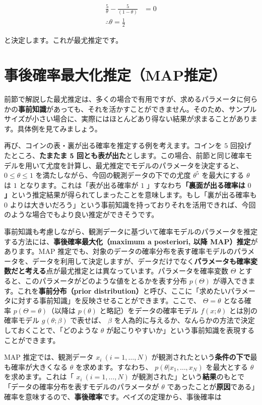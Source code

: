 \begin{align}
\frac{5}{\theta} - \frac{5}{\left( 1 - \theta \right)} &= 0 \\
\therefore \theta = \frac{1}{2}
\end{align}


と決定します。これが最尤推定です。


\section{事後確率最大化推定（MAP推定）}


前節で解説した最尤推定は、多くの場合で有用ですが、求めるパラメータに何らかの\textbf{事前知識}があっても、それを活かすことができません。そのため、サンプルサイズが小さい場合に、実際にはほとんどあり得ない結果が求まることがあります。具体例を見てみましょう。


再び、コインの表・裏が出る確率を推定する例を考えます。コインを $5$ 回投げたところ、\textbf{たまたま} ${\bf 5}$ \textbf{回とも表が出た}とします。この場合、前節と同じ確率モデルを用いて尤度を計算し、最尤推定でモデルのパラメータを決定すると、 $0 \leq \theta \leq 1$ を満たしながら、今回の観測データの下での尤度 $\theta^5$ を最大にする $\theta$ は $1$ となります。これは「表が出る確率が $1$ 」すなわち\textbf{「裏面が出る確率は} $0$\textbf{」}という推定結果が得られてしまったことを意味します。もし「裏が出る確率も $0$ よりは大きいだろう」という事前知識を持っておりそれを活用できれば、今回のような場合でもより良い推定ができそうです。


事前知識も考慮しながら、観測データに基づいて確率モデルのパラメータを推定する方法には、\textbf{事後確率最大化（maximum a posteriori, 以降 MAP）推定}があります。MAP 推定でも、対象のデータの確率分布を表す確率モデルのパラメータを、データを利用して決定しますが、データだけでなく\textbf{パラメータも確率変数だと考える}点が最尤推定とは異なっています。パラメータを確率変数 $\Theta$ とすると、このパラメータがどのような値をとるかを表す分布 $p(\Theta)$ が導入できます。これを\textbf{事前分布（prior distribution）}と呼び、ここに「求めたいパラメータに対する事前知識」を反映させることができます。ここで、 $\Theta = \theta$ となる確率 $p(\Theta = \theta)$（以降は $p(\theta)$ と略記）をデータの確率モデル $f(x; \theta)$ とは別の確率モデル $g(\theta; \beta)$ で表せば、 $\beta$ を人為的に与えるか、なんらかの方法で決定しておくことで、「どのような $\theta$ が起こりやすいか」という事前知識を表現することができます。


MAP 推定では、観測データ $x_i \ (i=1,\dots,N)$ が観測されたという\textbf{条件の下で}最も確率が大きくなる $\theta$ を求めます。すなわち、 $p(\theta | x_1, \dots, x_N)$ を最大とする $\theta$ を求めます。これは「 $x_i \ (i=1,\dots,N)$ が観測された」という\textbf{結果}のもとで「データの確率分布を表すモデルのパラメータが $\theta$ であったことが\textbf{原因}である」確率を意味するので、\textbf{事後確率}です。ベイズの定理から、事後確率は


